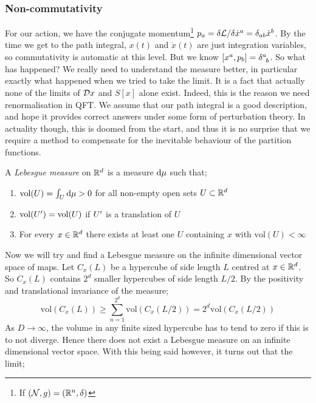 \subsubsection{Non-commutativity}
For our action, we have the conjugate momentum\footnote{If $(\mathcal{N}, g) = (\mathbb{R}^n, \delta)$} $p_a = \delta \mathcal{L}/ \delta \dot{x}^a = \delta_{ab}\dot{x}^{b}$. By the time we get to the path integral, $x(t)$ and $\dot{x}(t)$ are just integration variables, so commutativity is automatic at this level. But we know $[x^a, p_b] = \delta\indices{^{a}_{b}}$. So what has happened? We really need to understand the measure better, in particular exactly what happened when we tried to take the limit. It is a fact that actually none of the limits of $\mathcal{D} x$ and $S[x]$ alone exist. Indeed, this is the reason we need renormalisation in QFT. We assume that our path integral is a good description, and hope it provides correct answers under some form of perturbation theory. In actuality though, this is doomed from the start, and thus it is no surprise that we require a method to compensate for the inevitable behaviour of the partition functions. 
\begin{definitionbox}
A \emph{Lebesgue measure} on $\mathbb{R}^{d}$ is a measure $\text{d} \mu$ such that;
\begin{enumerate}
\item $\text{vol}(U) = \int_U{\text{d} \mu} > 0$ for all non-empty open sets $U \subset \mathbb{R}^{d}$
\item $\text{vol}(U^{\prime}) = \text{vol}(U)$ if $U^{\prime}$ is a translation of $U$
\item For every $x \in \mathbb{R}^{d}$ there exists at least one $U$ containing $x$ with $\text{vol}(U) < \infty$
\end{enumerate}
\end{definitionbox}
Now we will try and find a Lebesgue measure on the infinite dimensional vector space of maps. Let $C_x(L)$ be a hypercube of side length $L$ centred at $x\in\mathbb{R}^d$. So $C_x(L)$ contains $2^d$ smaller hypercubes of side length $L/2$. By the positivity and translational invariance of the measure;
\begin{equation*}
\text{vol}\left(C_x(L)\right) \geq \sum_{n = 1}^{2^d}{\text{vol}\left(C_x(L/2)\right)} = 2^d \text{vol}\left(C_x(L/2)\right)
\end{equation*}
As $D \rightarrow \infty$, the volume in any finite sized hypercube has to tend to zero if this is to not diverge. Hence there does not exist a Lebesgue measure on an infinite dimensional vector space. With this being said however, it turns out that the limit;
